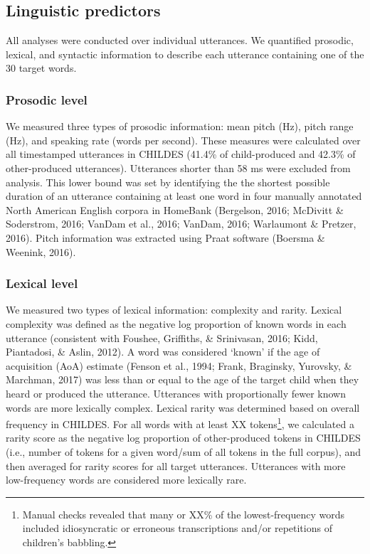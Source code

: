 \documentclass[10pt, letterpaper]{article}
\begin{document}
\hypertarget{linguistic-predictors}{%
\subsection{Linguistic predictors}\label{linguistic-predictors}}

All analyses were conducted over individual utterances. We quantified
prosodic, lexical, and syntactic information to describe each utterance
containing one of the 30 target words.

\hypertarget{prosodic-level}{%
\subsubsection{Prosodic level}\label{prosodic-level}}

We measured three types of prosodic information: mean pitch (Hz), pitch
range (Hz), and speaking rate (words per second). These measures were
calculated over all timestamped utterances in CHILDES (41.4\% of
child-produced and 42.3\% of other-produced utterances). Utterances
shorter than 58 ms were excluded from analysis. This lower bound was set
by identifying the the shortest possible duration of an utterance
containing at least one word in four manually annotated North American
English corpora in HomeBank (Bergelson, 2016; McDivitt \& Soderstrom,
2016; VanDam et al., 2016; VanDam, 2016; Warlaumont \& Pretzer, 2016).
Pitch information was extracted using Praat software (Boersma \&
Weenink, 2016).

\hypertarget{lexical-level}{%
\subsubsection{Lexical level}\label{lexical-level}}

We measured two types of lexical information: complexity and rarity.
Lexical complexity was defined as the negative log proportion of known
words in each utterance (consistent with Foushee, Griffiths, \&
Srinivasan, 2016; Kidd, Piantadosi, \& Aslin, 2012). A word was
considered `known' if the age of acquisition (AoA) estimate (Fenson et
al., 1994; Frank, Braginsky, Yurovsky, \& Marchman, 2017) was less than
or equal to the age of the target child when they heard or produced the
utterance. Utterances with proportionally fewer known words are more
lexically complex. Lexical rarity was determined based on overall
frequency in CHILDES. For all words with at least XX tokens\footnote{Manual
  checks revealed that many or XX\% of the lowest-frequency words
  included idiosyncratic or erroneous transcriptions and/or repetitions
  of children's babbling.}, we calculated a rarity score as the negative
log proportion of other-produced tokens in CHILDES (i.e., number of
tokens for a given word/sum of all tokens in the full corpus), and then
averaged for rarity scores for all target utterances. Utterances with
more low-frequency words are considered more lexically rare. \newline
\end{document}
